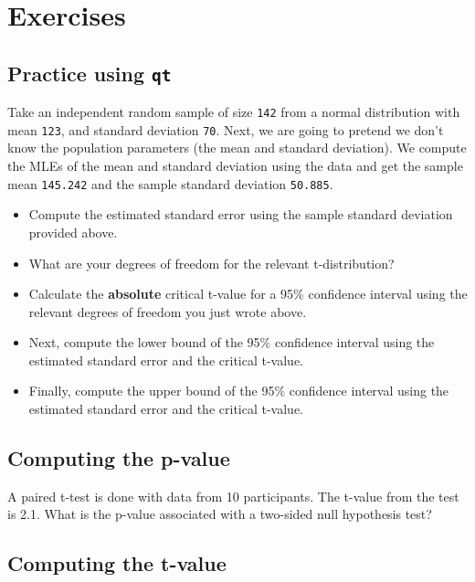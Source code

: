 \documentclass[12pt,]{krantz}
\providecommand{\tightlist}{%
  \setlength{\itemsep}{0pt}\setlength{\parskip}{0pt}}
\begin{document}
\hypertarget{sec:SamplingDistrnexercises}{%
\section{Exercises}\label{sec:SamplingDistrnexercises}}

\hypertarget{sec:SamplingDistrnexercisesqt}{%
\subsection{\texorpdfstring{Practice using \texttt{qt}}{Practice using qt}}\label{sec:SamplingDistrnexercisesqt}}

Take an independent random sample of size \texttt{142} from a normal distribution
with mean \texttt{123}, and standard deviation \texttt{70}. Next, we are going to pretend we don't know the population parameters (the mean and standard deviation). We compute the MLEs of the mean and standard deviation using the data and get the sample mean \texttt{145.242} and the sample standard deviation \texttt{50.885}.

\begin{itemize}
\tightlist
\item
  Compute the estimated standard error using the sample standard deviation provided above.
\item
  What are your degrees of freedom for the relevant t-distribution?
\item
  Calculate the \textbf{absolute} critical t-value for a 95\% confidence interval using the relevant degrees of freedom you just wrote above.
\item
  Next, compute the lower bound of the 95\% confidence interval using the estimated standard error and the critical t-value.
\item
  Finally, compute the upper bound of the 95\% confidence interval using the estimated standard error and the critical t-value.
\end{itemize}

\hypertarget{sec:SamplingDistrnexercisesPart1}{%
\subsection{Computing the p-value}\label{sec:SamplingDistrnexercisesPart1}}

A paired t-test is done with data from 10 participants. The t-value from the test is 2.1. What is the p-value associated with a two-sided null hypothesis test?

\hypertarget{sec:SamplingDistrnexercisesPart2}{%
\subsection{Computing the t-value}\label{sec:SamplingDistrnexercisesPart2}}
\end{document}
